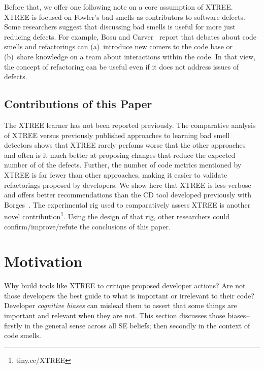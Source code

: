 \documentclass{sig-alternate}
\theoremstyle{break}
\begin{document}
Before  that, we offer one following note on a
core assumption of XTREE.
XTREE   is focused on Fowler's bad smells
as contributors to software defects. Some researchers 
 suggest that discussing bad smells is useful for more just reducing defects. For example, Bosu and Carver~\cite{bosu13} report that
debates about code smells and refactorings can (a)~introduce new comers to the code base or (b)~share knowledge on a team
about interactions within the code. In that view, 
the concept of refactoring can be useful
even if it does not address issues of defects. 

\subsection{Contributions of this Paper }
The XTREE learner has not been reported
previously. 
The comparative analysis of XTREE
    versus previously published approaches to learning
    bad smell detectors shows
    that XTREE   rarely perfoms
      worse that the other approaches~\cite{Shatnawi10,Alves2010}
      and often is it   much better at proposing
      changes that reduce the expected
      number of of the defects. Further, the number
    of code metrics mentioned by XTREE is far
    fewer than other approaches, making it easier to validate refactorings proposed by
    developers. 
We
show here that XTREE is less verbose and offers better recommendations than the CD tool   developed previously with Borges~\cite{me12c}.
 The experimental rig
 used to comparatively assess
    XTREE is another novel contribution\footnote{tiny.cc/XTREE}. Using the design
    of that rig,
    other researchers could confirm/improve/refute
    the conclusions of this paper.
    

 
 
   


\section{Motivation}\label{sect:prelim}

Why build tools like XTREE to  critique proposed developer actions?
Are not those developers the best guide to what is important or irrelevant
to their code? Developer {\em cognitive biases} can mislead them to
assert that some things are important and relevant when they are not.
This section discusses those biases-- firstly in the general sense
across all SE beliefs; then secondly in the   context of code smells.
\end{document}
